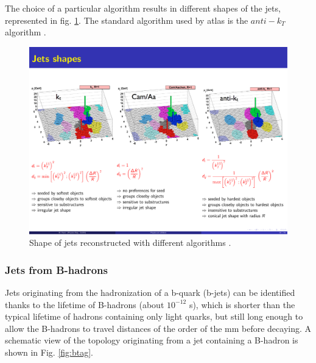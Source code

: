 The choice of a particular algorithm results in different shapes of the jets, represented in fig. \ref{fig:jetsalg}. The standard algorithm used by \gls{atlas} is the $anti-k_T$ algorithm \cite{cacciari:antikt}.

\begin{figure}[h]
\includegraphics[width=\textwidth]{./figures/objects/jetsalg.pdf}
\caption[Shape of jets reconstructed with different algorithms]{Shape of jets reconstructed with different algorithms \cite{cacciari:antikt}.}
\label{fig:jetsalg}
\end{figure}


\subsubsection{Jets from B-hadrons}

Jets originating from the hadronization of a b-quark (b-jets) can be identified thanks to the lifetime of B-hadrons (about $10^{-12}$ s), which is shorter than the typical lifetime of hadrons containing only light quarks, but still long enough to allow the B-hadrons to travel distances of the order of the mm before decaying. A schematic view of the topology originating from a jet containing a B-hadron is shown in Fig. \ref{fig:btag}.



